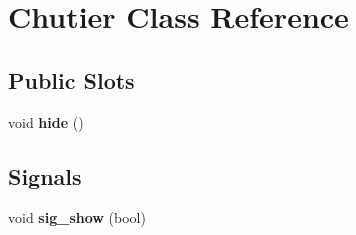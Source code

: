 \hypertarget{class_chutier}{\section{\-Chutier \-Class \-Reference}
\label{class_chutier}
}
\subsection*{\-Public \-Slots}
\begin{DoxyCompactItemize}
\item 
\hypertarget{class_chutier_a371bb3ff033a5edf37b67eaeca109e29}{void {\bfseries hide} ()}\label{class_chutier_a371bb3ff033a5edf37b67eaeca109e29}

\end{DoxyCompactItemize}
\subsection*{\-Signals}
\begin{DoxyCompactItemize}
\item 
\hypertarget{class_chutier_af48c7afdd6a9154410abb35afb12d723}{void {\bfseries sig\-\_\-show} (bool)}\label{class_chutier_af48c7afdd6a9154410abb35afb12d723}

\end{DoxyCompactItemize}
